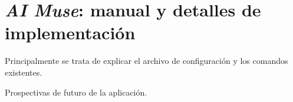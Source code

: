 \chapter{\textit{AI Muse}: manual y detalles de implementación}
\label{anexo:aimuse}


Principalmente se trata de explicar el archivo de configuración y los comandos existentes.

Prospectivas de futuro de la aplicación.
